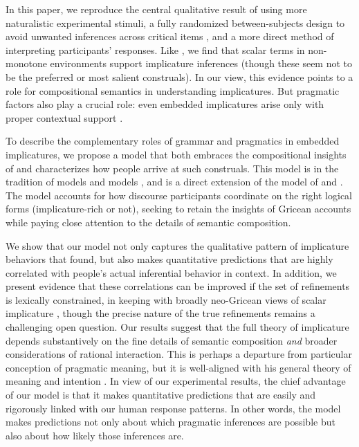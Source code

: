\documentclass[leqno,12pt]{article}
\begin{document}

In this paper, we reproduce the central qualitative result of
\citet{Chemla:Spector:2011} using more naturalistic experimental
stimuli, a fully randomized between-subjects design to avoid unwanted
inferences across critical items \citep{geurts-vantiel:2013:scalar},
and a more direct method of interpreting participants' responses. Like
\citeauthor{Chemla:Spector:2011}, we find that scalar terms in
non-monotone environments support implicature inferences (though these
seem not to be the preferred or most salient construals).  In our
view, this evidence points to a role for compositional semantics in
understanding implicatures. But pragmatic factors also play a crucial
role: even embedded implicatures arise only with proper contextual
support
\citep{Russell06,ChierchiaFoxSpector08,Geurts:2011,Chemla:Spector:2011}.

To describe the complementary roles of grammar and pragmatics in
embedded implicatures, we propose a model that both embraces the
compositional insights of \citeauthor{ChierchiaFoxSpector08} and
characterizes how people arrive at such construals. This model is in
the tradition of  models
\citep{Frank:Goodman:2012,Goodman:Stuhlmuller:2013} and  models \citep{Franke09DISS,Jaeger:2011}, and is a
direct extension of the  model
of \citet{Bergen:Goodman:Levy:2012} and
\citet{Bergen:Levy:Goodman:2014}. The model accounts for how discourse
participants coordinate on the right logical forms (implicature-rich
or not), seeking to retain the insights of Gricean accounts while
paying close attention to the details of semantic composition.


We show that our model not only captures the qualitative pattern of
implicature behaviors that \citeauthor{Chemla:Spector:2011} found, but
also makes quantitative predictions that are highly correlated with
people's actual inferential behavior in context. In addition, we
present evidence that these correlations can be improved if the set of
refinements is lexically constrained, in keeping with broadly
neo-Gricean views of scalar implicature
\citep{Horn72,Gazdar79b,Gazdar79a,SchulzVanRooij06}, though the
precise nature of the true refinements remains a challenging open
question.  Our results suggest that the full theory of implicature
depends substantively on the fine details of semantic composition
\emph{and} broader considerations of rational interaction. This is
perhaps a departure from  particular conception of
pragmatic meaning, but it is well-aligned with his general theory of
meaning and intention \citep{Grice89}.  In view of our experimental
results, the chief advantage of our model is that it makes
quantitative predictions that are easily and rigorously linked with
our human response patterns. In other words, the model makes
predictions not only about which pragmatic inferences are possible but
also about how likely those inferences are.
\end{document}
